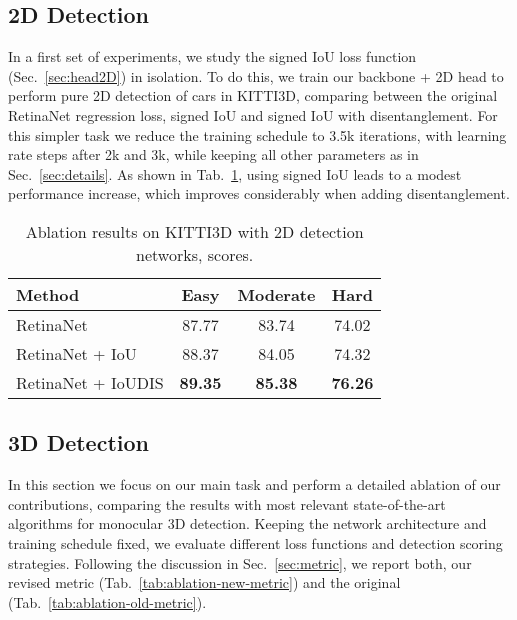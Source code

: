 \documentclass[10pt,twocolumn,letterpaper]{article}
\newcommand{\ioudis}{IoUDIS}
\begin{document}
\subsection{2D Detection}

In a first set of experiments, we study the signed IoU loss function (Sec.~\ref{sec:head2D}) in isolation.
To do this, we train our backbone + 2D head to perform pure 2D detection of cars in KITTI3D, comparing between the original RetinaNet regression loss, signed IoU and signed IoU with disentanglement.
For this simpler task we reduce the training schedule to 3.5k iterations, with learning rate steps after 2k and 3k, while keeping all other parameters as in Sec.~\ref{sec:details}.
As shown in Tab.~\ref{tab:results2d}, using signed IoU leads to a modest performance increase, which improves considerably when adding disentanglement.
\begin{table}[th]
    \centering
    {\footnotesize
    \begin{tabular}{l|ccc}
        \toprule
        Method & Easy & Moderate & Hard \\
        \midrule
        RetinaNet & 87.77 & 83.74 & 74.02 \\
        RetinaNet + IoU & 88.37 & 84.05 & 74.32 \\
        RetinaNet + \ioudis & \textbf{89.35} & \textbf{85.38} & \textbf{76.26} \\
        \bottomrule
    \end{tabular}}
    \caption{Ablation results on KITTI3D with 2D detection networks,  scores.}
    \vspace{-1em}
    \label{tab:results2d}
\end{table}


\subsection{3D Detection}

In this section we focus on our main task and perform a detailed ablation of our contributions, comparing the results with most relevant state-of-the-art algorithms for monocular 3D detection.
Keeping the network architecture and training schedule fixed, we evaluate different loss functions and detection scoring strategies.
Following the discussion in Sec.~\ref{sec:metric}, we report both, our revised  metric (Tab.~\ref{tab:ablation-new-metric}) and the original  (Tab.~\ref{tab:ablation-old-metric}).
\end{document}
